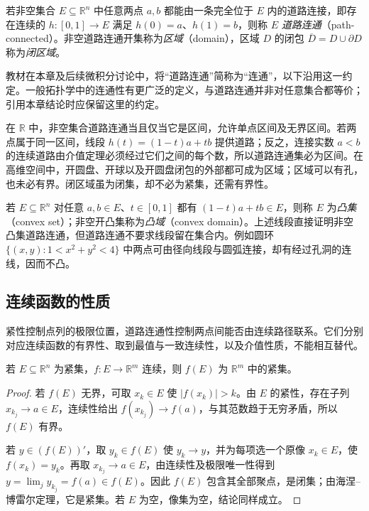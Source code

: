 \begin{definition}
\label{def:path-connected-set-and-domain}
若非空集合 $E\subseteq\mathbb R^n$ 中任意两点 $a,b$ 都能由一条完全位于 $E$ 内的道路连接，即存在连续的 $h:[0,1]\to E$ 满足 $h(0)=a$、$h(1)=b$，则称 $E$ \emph{道路连通}（path-connected）。非空道路连通开集称为\emph{区域}（domain），区域 $D$ 的闭包 $\overline D=D\cup\partial D$ 称为\emph{闭区域}。
\end{definition}

\begin{notealert}[type=caution,title={本章的连通性约定}]
教材在本章及后续微积分讨论中，将“道路连通”简称为“连通”，以下沿用这一约定。一般拓扑学中的连通性有更广泛的定义，与道路连通并非对任意集合都等价；引用本章结论时应保留这里的约定。
\end{notealert}

在 $\mathbb R$ 中，非空集合道路连通当且仅当它是区间，允许单点区间及无界区间。若两点属于同一区间，线段 $h(t)=(1-t)a+tb$ 提供道路；反之，连接实数 $a<b$ 的连续道路由介值定理必须经过它们之间的每个数，所以道路连通集必为区间。在高维空间中，开圆盘、开球以及开圆盘闭包的外部都可成为区域；区域可以有孔，也未必有界。闭区域虽为闭集，却不必为紧集，还需有界性。

若 $E\subseteq\mathbb R^n$ 对任意 $a,b\in E$、$t\in[0,1]$ 都有 $(1-t)a+tb\in E$，则称 $E$ 为\emph{凸集}（convex set）；非空开凸集称为\emph{凸域}（convex domain）。上述线段直接证明非空凸集道路连通，但道路连通不要求线段留在集合内。例如圆环 $\{(x,y):1<x^2+y^2<4\}$ 中两点可由径向线段与圆弧连接，却有经过孔洞的连线，因而不凸。

\subsection{连续函数的性质}
\label{subsec:properties-of-continuous-multivariable-functions}

紧性控制点列的极限位置，道路连通性控制两点间能否由连续路径联系。它们分别对应连续函数的有界性、取到最值与一致连续性，以及介值性质，不能相互替代。

\begin{theorem}[连续像保持紧性]
\label{thm:continuous-image-of-euclidean-compact-set}
若 $E\subseteq\mathbb R^n$ 为紧集，$f:E\to\mathbb R^m$ 连续，则 $f(E)$ 为 $\mathbb R^m$ 中的紧集。
\end{theorem}

\begin{proof}
若 $f(E)$ 无界，可取 $x_k\in E$ 使 $|f(x_k)|>k$。由 $E$ 的紧性，存在子列 $x_{k_j}\to a\in E$，连续性给出 $f(x_{k_j})\to f(a)$，与其范数趋于无穷矛盾，所以 $f(E)$ 有界。

若 $y\in(f(E))'$，取 $y_k\in f(E)$ 使 $y_k\to y$，并为每项选一个原像 $x_k\in E$，使 $f(x_k)=y_k$。再取 $x_{k_j}\to a\in E$，由连续性及极限唯一性得到 $y=\lim_jy_{k_j}=f(a)\in f(E)$。因此 $f(E)$ 包含其全部聚点，是闭集；由海涅--博雷尔定理，它是紧集。若 $E$ 为空，像集为空，结论同样成立。
\end{proof}

